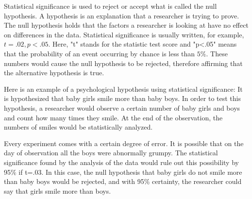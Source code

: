 Statistical significance is used to reject or accept what is called the null hypothesis. A hypothesis is an explanation that a researcher is trying to prove. The null hypothesis holds that the factors a researcher is looking at have no effect on differences in the data. Statistical significance is usually written, for example, $t=.02, p<.05$. Here, "t" stands for the statistic test score and "p<.05" means that the probability of an event occurring by chance is less than $5\%$. These numbers would cause the null hypothesis to be rejected, therefore affirming that the alternative hypothesis is true.

Here is an example of a psychological hypothesis using statistical significance: It is hypothesized that baby girls smile more than baby boys. In order to test this hypothesis, a researcher would observe a certain number of baby girls and boys and count how many times they smile. At the end of the observation, the numbers of smiles would be statistically analyzed.

Every experiment comes with a certain degree of error. It is possible that on the day of observation all the boys were abnormally grumpy. The statistical significance found by the analysis of the data would rule out this possibility by 95\% if t=.03. In this case, the null hypothesis that baby girls do not smile more than baby boys would be rejected, and with 95\% certainty, the researcher could say that girls smile more than boys.
